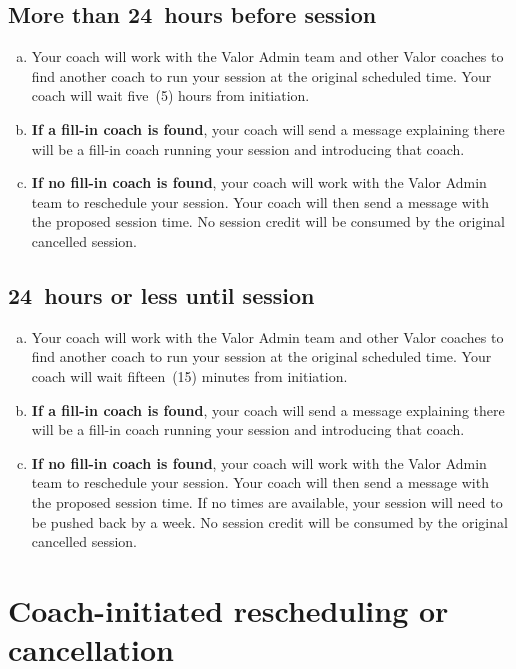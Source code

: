 \documentclass[10pt]{article}
\begin{document}
\subsection{More than 24~hours before session}
\begin{enumerate}[(a)]
\item
Your coach will work with the Valor Admin team and other Valor coaches to find another coach to run your session at the original scheduled time. Your coach will wait five~(5) hours from initiation.

\item
\textbf{If a fill-in coach is found}, your coach will send a message explaining there will be a fill-in coach running your session and introducing that coach.

\item
\textbf{If no fill-in coach is found}, your coach will work with the Valor Admin team to reschedule your session. Your coach will then send a message with the proposed session time. No session credit will be consumed by the original cancelled session.
\end{enumerate}

\subsection{24~hours or less until session}
\begin{enumerate}[(a)]
\item
Your coach will work with the Valor Admin team and other Valor coaches to find another coach to run your session at the original scheduled time. Your coach will wait fifteen~(15) minutes from initiation.

\item
\textbf{If a fill-in coach is found}, your coach will send a message explaining there will be a fill-in coach running your session and introducing that coach.

\item
\textbf{If no fill-in coach is found}, your coach will work with the Valor Admin team to reschedule your session. Your coach will then send a message with the proposed session time. If no times are available, your session will need to be pushed back by a week. No session credit will be consumed by the original cancelled session.
\end{enumerate}


\section{Coach-initiated rescheduling or cancellation}
\end{document}
